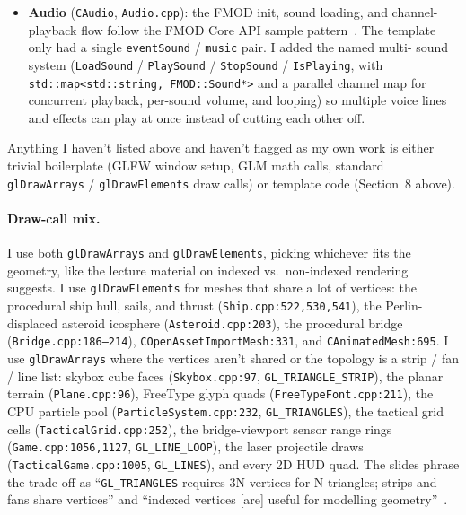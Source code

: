 \documentclass[11pt,a4paper]{article}
\begin{document}
\begin{itemize}
        procedural-cylinder notes~\cite{songho_cylinder}; the door cutout,
        floor grid, and viewport quad are mine.
  \item \textbf{Audio} (\texttt{CAudio}, \texttt{Audio.cpp}): the FMOD
        init, sound loading, and channel-playback flow follow the FMOD Core
        API sample pattern~\cite{fmod_docs}. The template only had a single
        \texttt{eventSound} / \texttt{music} pair. I added the named multi-
        sound system (\texttt{LoadSound} / \texttt{PlaySound} /
        \texttt{StopSound} / \texttt{IsPlaying}, with
        \texttt{std::map<std::string,\,FMOD::Sound*>} and a parallel channel
        map for concurrent playback, per-sound volume, and looping) so
        multiple voice lines and effects can play at once instead of
        cutting each other off.
\end{itemize}

Anything I haven't listed above and haven't flagged as my own work is
either trivial boilerplate (GLFW window setup, GLM math calls, standard
\texttt{glDrawArrays} / \texttt{glDrawElements} draw calls) or template
code (Section~8 above).

\paragraph{Draw-call mix.}
I use both \texttt{glDrawArrays} and \texttt{glDrawElements}, picking
whichever fits the geometry, like the lecture material on indexed vs.\
non-indexed rendering~\cite{in3005_lectures} suggests. I use
\texttt{glDrawElements} for meshes that share a lot of vertices: the
procedural ship hull, sails, and thrust (\texttt{Ship.cpp:522,530,541}),
the Perlin-displaced asteroid icosphere (\texttt{Asteroid.cpp:203}), the
procedural bridge (\texttt{Bridge.cpp:186--214}),
\texttt{COpenAssetImportMesh:331}, and \texttt{CAnimatedMesh:695}. I use
\texttt{glDrawArrays} where the vertices aren't shared or the topology is
a strip / fan / line list: skybox cube faces (\texttt{Skybox.cpp:97},
\texttt{GL\_TRIANGLE\_STRIP}), the planar terrain (\texttt{Plane.cpp:96}),
FreeType glyph quads (\texttt{FreeTypeFont.cpp:211}), the CPU particle pool
(\texttt{ParticleSystem.cpp:232}, \texttt{GL\_TRIANGLES}), the tactical
grid cells (\texttt{TacticalGrid.cpp:252}), the bridge-viewport sensor
range rings (\texttt{Game.cpp:1056,1127}, \texttt{GL\_LINE\_LOOP}), the
laser projectile draws (\texttt{TacticalGame.cpp:1005}, \texttt{GL\_LINES}),
and every 2D HUD quad. The slides phrase the trade-off as
``\texttt{GL\_TRIANGLES} requires 3N vertices for N triangles; strips and
fans share vertices'' and ``indexed vertices [are] useful for modelling
geometry''~\cite{in3005_lectures}.
\end{document}
